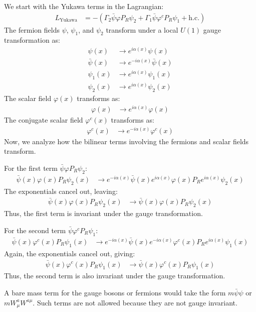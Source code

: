 \begin{enumerate}
We start with the Yukawa terms in the Lagrangian:
\begin{align}
    L_{\text{Yukawa}} &= - \left( \Gamma_2 \bar{\psi} \varphi P_R \psi_2 + \Gamma_1 \bar{\psi} \varphi^c P_R \psi_1 + \text{h.c.} \right)\label{eq:yukawa-lagrangian-def}
\end{align}
The fermion fields $\psi$, $\psi_1$, and $\psi_2$ transform under a local $U(1)$ gauge transformation as:
\begin{align*}
    \psi(x) &\to e^{\displaystyle i \alpha(x)} \psi(x) \\
    \bar{\psi}(x) &\to e^{\displaystyle -i \alpha(x)} \bar{\psi}(x) \\
    \psi_1(x) &\to e^{\displaystyle i \alpha(x)} \psi_1(x) \\
    \psi_2(x) &\to e^{\displaystyle i \alpha(x)} \psi_2(x)
\end{align*}
The scalar field $\varphi(x)$ transforms as:
\begin{align*}
    \varphi(x) &\to e^{\displaystyle i \alpha(x)} \varphi(x)
\end{align*}
The conjugate scalar field $\varphi^c(x)$ transforms as:
\begin{align*}
    \varphi^c(x) &\to e^{\displaystyle -i \alpha(x)} \varphi^c(x)
\end{align*}
Now, we analyze how the bilinear terms involving the fermions and scalar fields transform.

For the first term $\bar{\psi} \varphi P_R \psi_2$:
\begin{align*}
    \bar{\psi}(x) \varphi(x) P_R \psi_2(x) &\to e^{\displaystyle -i \alpha(x)} \bar{\psi}(x) e^{i \alpha(x)} \varphi(x) P_R e^{\displaystyle i \alpha(x)} \psi_2(x)
\end{align*}
The exponentials cancel out, leaving:
\begin{align*}
    \bar{\psi}(x) \varphi(x) P_R \psi_2(x) &\to \bar{\psi}(x) \varphi(x) P_R \psi_2(x)
\end{align*}
Thus, the first term is invariant under the gauge transformation.

For the second term $\bar{\psi} \varphi^c P_R \psi_1$:
\begin{align*}
    \bar{\psi}(x) \varphi^c(x) P_R \psi_1(x) &\to e^{\displaystyle -i \alpha(x)} \bar{\psi}(x) e^{\displaystyle -i \alpha(x)} \varphi^c(x) P_R e^{\displaystyle i \alpha(x)} \psi_1(x)
\end{align*}
Again, the exponentials cancel out, giving:
\begin{align*}
    \bar{\psi}(x) \varphi^c(x) P_R \psi_1(x) &\to \bar{\psi}(x) \varphi^c(x) P_R \psi_1(x)
\end{align*}
Thus, the second term is also invariant under the gauge transformation.
\end{enumerate}
A bare mass term for the gauge bosons or fermions would take the form $m \bar{\psi} \psi$ or $m W_\mu^a W^{a\mu}$. Such terms are not allowed because they are not gauge invariant.

